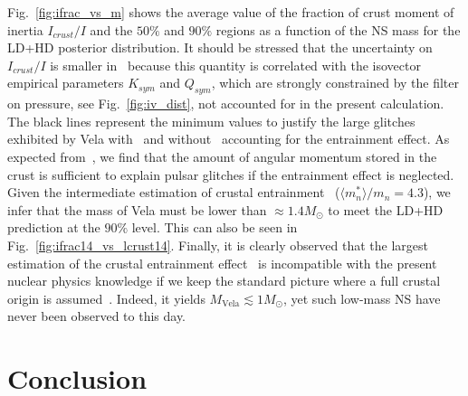 Fig.~\ref{fig:ifrac_vs_m} shows the average value of the fraction of crust 
moment of inertia $I_{crust}/I$ and the $50\%$ and $90\%$ regions 
as a function of the NS mass for the LD+HD posterior distribution. It should be
stressed that the uncertainty on $I_{crust}/I$ is smaller 
in~\cite{Carreau2019moi} because this quantity is correlated with the 
isovector empirical parameters $K_{sym}$ and $Q_{sym}$, which are strongly
constrained by the filter on pressure, see Fig.~\ref{fig:iv_dist}, not
accounted for in the present calculation. The black
lines represent the minimum values to justify the large glitches exhibited by
Vela with~\cite{Delsate2016,Andersson2012} and without~\cite{Link1999} 
accounting for the entrainment effect. As expected from~\cite{Link1999}, we
find that the amount of angular momentum stored in the crust is sufficient to
explain pulsar glitches if the entrainment effect is neglected.
Given the intermediate estimation of crustal entrainment~\cite{Andersson2012}
($\langle m_n^*\rangle/m_n = 4.3$), we infer that the mass of Vela must be
lower than $\approx 1.4M_\odot$ to meet the LD+HD prediction at the $90\%$
level. This can also be seen in Fig.~\ref{fig:ifrac14_vs_lcrust14}.
Finally, it is clearly observed that the largest estimation of the crustal 
entrainment effect~\cite{Delsate2016} is incompatible with the present nuclear 
physics knowledge if we keep the standard picture where a full crustal origin 
is assumed~\cite{Anderson1975}. Indeed, it yields $M_\text{Vela} \lesssim 
1M_\odot$, yet such low-mass NS have never been observed to this day.

\section{Conclusion}\label{sec:conclu2}

